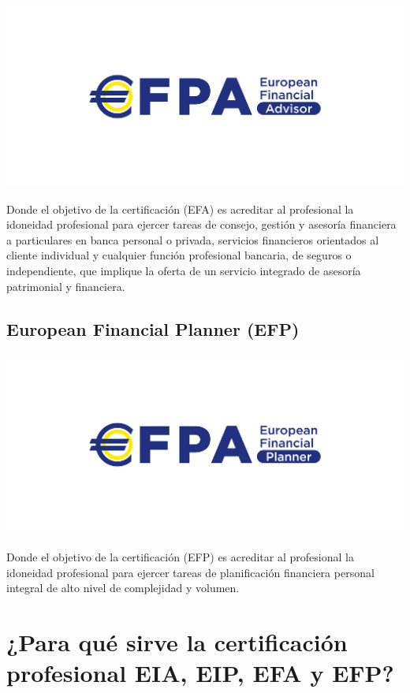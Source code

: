 \documentclass[
  letterpaper,
  DIV=11,
  numbers=noendperiod]{scrreprt}
\begin{document}
\includegraphics{./images/EFA_logo-01.jpg}

Donde el objetivo de la certificación (EFA) es acreditar al profesional
la idoneidad profesional para ejercer tareas de consejo, gestión y
asesoría financiera a particulares en banca personal o privada,
servicios financieros orientados al cliente individual y cualquier
función profesional bancaria, de seguros o independiente, que implique
la oferta de un servicio integrado de asesoría patrimonial y financiera.

\hypertarget{european-financial-planner-efp}{%
\subsection*{\texorpdfstring{\textbf{European Financial Planner
(EFP)}}{European Financial Planner (EFP)}}\label{european-financial-planner-efp}}

\includegraphics{./images/EFP_logo.jpg}

Donde el objetivo de la certificación (EFP) es acreditar al profesional
la idoneidad profesional para ejercer tareas de planificación financiera
personal integral de alto nivel de complejidad y volumen.

\hypertarget{para-quuxe9-sirve-la-certificaciuxf3n-profesional-eia-eip-efa-y-efp}{%
\section*{\texorpdfstring{\textbf{¿Para qué sirve la certificación
profesional EIA, EIP, EFA y
EFP?}}{¿Para qué sirve la certificación profesional EIA, EIP, EFA y EFP?}}\label{para-quuxe9-sirve-la-certificaciuxf3n-profesional-eia-eip-efa-y-efp}}
\end{document}
